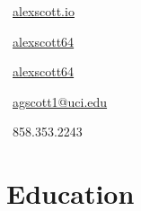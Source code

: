 \documentclass[letterpaper]{styles} %
\begin{document}


\def\columnseprulecolor{\color{gray}}

\begin{minipage}[t]{0.33\textwidth} %


\vspace{3mm}
{\color{RoyalBlue} \Large \faGlobe} \, \color{black}\href{https://alexscott.io}{alexscott.io} 
\vspace{1mm}

{\color{RoyalBlue} \Large \faLinkedin} \, \href{http://linkedin.com/in/alexscott64}{alexscott64} 
\vspace{1mm}

{\color{RoyalBlue} \Large \faGithub} \, \href{http://github.com/alexscott64}{alexscott64} 
\vspace{1mm}

{\color{RoyalBlue} \Large \faEnvelopeO} \, \href{mailto:agscott1@uci.edu}{agscott1@uci.edu} 
\vspace{1mm}

{\color{RoyalBlue} \Large \faPhone} \, 858.353.2243
\vspace{1mm}


\section{Education} 


\vspace{1mm}


\end{minipage}
\end{document}
